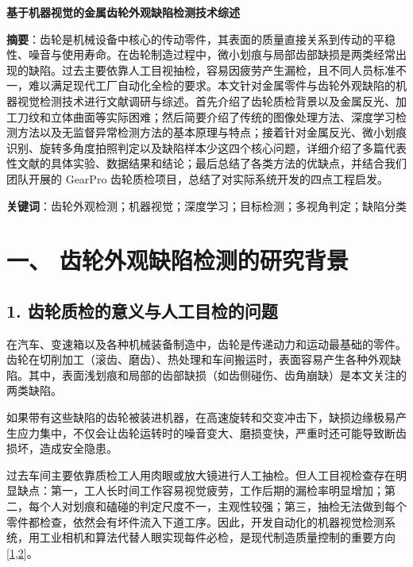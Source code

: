 \begin{center}
{\bfseries 基于机器视觉的金属齿轮外观缺陷检测技术综述\par}
\end{center}

\textbf{摘要}：齿轮是机械设备中核心的传动零件，其表面的质量直接关系到传动的平稳性、噪音与使用寿命。在齿轮制造过程中，微小划痕与局部齿部缺损是两类经常出现的缺陷。过去主要依靠人工目视抽检，容易因疲劳产生漏检，且不同人员标准不一，难以满足现代工厂自动化全检的要求。本文针对金属零件与齿轮外观缺陷的机器视觉检测技术进行文献调研与综述。首先介绍了齿轮质检背景以及金属反光、加工刀纹和立体曲面等实际困难；然后简要介绍了传统的图像处理方法、深度学习检测方法以及无监督异常检测方法的基本原理与特点；接着针对金属反光、微小划痕识别、旋转多角度拍照判定以及缺陷样本少这四个核心问题，详细介绍了多篇代表性文献的具体实验、数据结果和结论；最后总结了各类方法的优缺点，并结合我们团队开展的 GearPro 齿轮质检项目，总结了对实际系统开发的四点工程启发。

\textbf{关键词}：齿轮外观检测；机器视觉；深度学习；目标检测；多视角判定；缺陷分类


\section*{一、 齿轮外观缺陷检测的研究背景}

\subsection*{1. 齿轮质检的意义与人工目检的问题}
在汽车、变速箱以及各种机械装备制造中，齿轮是传递动力和运动最基础的零件。齿轮在切削加工（滚齿、磨齿）、热处理和车间搬运时，表面容易产生各种外观缺陷。其中，表面浅划痕和局部的齿部缺损（如齿侧碰伤、齿角崩缺）是本文关注的两类缺陷。

如果带有这些缺陷的齿轮被装进机器，在高速旋转和交变冲击下，缺损边缘极易产生应力集中，不仅会让齿轮运转时的噪音变大、磨损变快，严重时还可能导致断齿损坏，造成安全隐患。

过去车间主要依靠质检工人用肉眼或放大镜进行人工抽检。但人工目视检查存在明显缺点：第一，工人长时间工作容易视觉疲劳，工作后期的漏检率明显增加；第二，每个人对划痕和磕碰的判定尺度不一，主观性较强；第三，抽检无法做到每个零件都检查，依然会有坏件流入下道工序。因此，开发自动化的机器视觉检测系统，用工业相机和算法代替人眼实现每件必检，是现代制造质量控制的重要方向[\hyperlink{ref:1}{1},\hyperlink{ref:2}{2}]。

